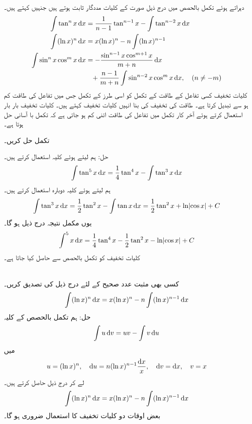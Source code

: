 دہراتے ہوئے تکمل بالحصص میں درج ذیل صورت کے کلیات مددگار ثابت ہوتے ہیں جنہیں  کہتے ہیں۔
\begin{align}
\int \tan^n x\dif x&=\frac{1}{n-1}\tan^{n-1}x-\int \tan^{n-2}x\dif x\label{مساوات_طریقہ_کلیات_تخفیف_الف}\\
\int(\ln x)^n\dif x&=x(\ln x)^n-n\int(\ln x)^{n-1}\label{مساوات_طریقہ_کلیات_تخفیف_ب}\\
\int\sin^nx\cos^mx\dif x&=-\frac{\sin^{n-1}x\cos^{m+1}x}{m+n}\dif x\nonumber\\
&\phantom{=}+\frac{n-1}{m+n}\int\sin^{n-2}x\cos^mx\dif x,\quad (n\ne -m)\label{مساوات_طریقہ_کلیات_تخفیف_پ}
\end{align}
کلیات تخفیف کسی تفاعل کے طاقت کے تکمل کو اسی طرز کے تکمل جس میں تفاعل کی طاقت کم ہو سے تبدیل کرتا ہے۔ طاقت کی تخفیف کی بنا انہیں کلیات تخفیف کہتے ہیں۔ کلیات تخفیف بار بار استعمال کرتے ہوئے آخر کار تکمل میں تفاعل کی طاقت اتنی کم ہو جاتی ہے کہ تکمل با آسانی حل ہوتا ہے۔

تکمل  حل کریں۔

حل:\quad
ہم  لیتے ہوئے کلیہ  استعمال کرتے ہیں۔
\begin{align*}
\int\tan^5x\dif x=\frac{1}{4}\tan^4x-\int\tan^3x\dif x
\end{align*}
ہم  لیتے ہوئے  کلیہ  دوبارہ استعمال کرتے ہیں۔
\begin{align*}
\int\tan^3x\dif x=\frac{1}{2}\tan^2x-\int \tan x\dif x=\frac{1}{2}\tan^2x+\ln\abs{\cos x}+C
\end{align*}
یوں مکمل نتیجہ درج ذیل ہو گا۔
\begin{align*}
\int^5x \dif x=\frac{1}{4}\tan^4x-\frac{1}{2}\tan^2x-\ln\abs{\cos x}+C
\end{align*}
کلیات تخفیف کو تکمل بالحصص سے حاصل کیا جاتا ہے۔

\\
کسی بھی مثبت عدد صحیح  کے لئے درج ذیل کی تصدیق کریں۔
\begin{align*}
\int (\ln x)^n\dif x=x(\ln x)^n-n\int (\ln x)^{n-1}\dif x
\end{align*}
حل:\quad
ہم تکمل بالحصص کے کلیہ
\begin{align*}
\int u\dif v=uv-\int v\dif u
\end{align*}
میں
\begin{align*}
u=(\ln x)^n,\quad \dif u=n(\ln x)^{n-1}\frac{\dif x}{x},\quad \dif v=\dif x,\quad v=x
\end{align*}
لے کر درج ذیل حاصل کرتے ہیں۔
\begin{align*}
\int (\ln x)^n\dif x=x(\ln x)^n-n\int (\ln x)^{n-1}\dif x
\end{align*}
بعض اوقات دو کلیات تخفیف کا استعمال ضروری ہو گا۔

